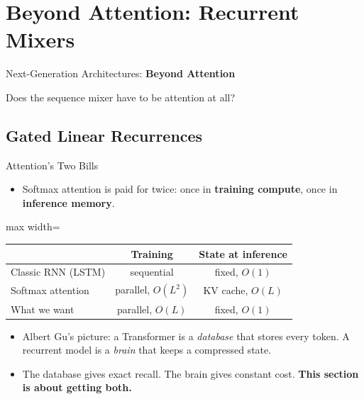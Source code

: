\section{Beyond Attention: Recurrent Mixers}

\begin{frame}{}
    \LARGE Next-Generation Architectures: \textbf{Beyond Attention}

    \vspace{1em}
    \normalsize Does the sequence mixer have to be attention at all?
\end{frame}

\subsection{Gated Linear Recurrences}

\begin{frame}{Attention's Two Bills}
    \begin{itemize}\itemsep0.5em
        \item Softmax attention is paid for twice: once in \textbf{training compute}, once in \textbf{inference memory}.
    \end{itemize}
    \vspace{0.3em}
    \begin{center}
    \begin{adjustbox}{max width=\linewidth}\begin{tabular}{lcc}
        \toprule
        & \textbf{Training} & \textbf{State at inference} \\
        \midrule
        Classic RNN (LSTM) & sequential & fixed, $O(1)$ \\
        Softmax attention & parallel, $O(L^2)$ & KV cache, $O(L)$ \\
        \rowcolor{KAUSTcyan!12} What we want & parallel, $O(L)$ & fixed, $O(1)$ \\
        \bottomrule
    \end{tabular}\end{adjustbox}
    \end{center}
    \vspace{0.3em}
    \begin{itemize}\itemsep0.5em
        \item Albert Gu's picture: a Transformer is a \emph{database} that stores every token. A recurrent model is a \emph{brain} that keeps a compressed state.
        \item The database gives exact recall. The brain gives constant cost. \textbf{This section is about getting both.}
    \end{itemize}
\end{frame}

